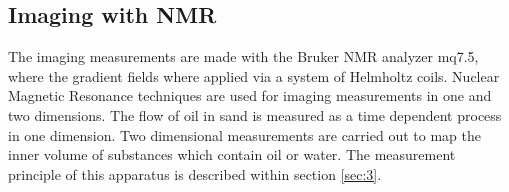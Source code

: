 \subsection{Imaging with NMR}
The imaging measurements are made with the Bruker NMR analyzer mq7.5, where the gradient fields where applied via a system of Helmholtz coils. Nuclear Magnetic Resonance techniques are used for imaging measurements in one and two dimensions. The flow of oil in sand is measured as a time dependent process in one dimension. Two dimensional measurements are carried out to map the inner volume of substances which contain oil or water. The measurement principle of this apparatus is described within section \ref{sec:3}.\cite{manual}

